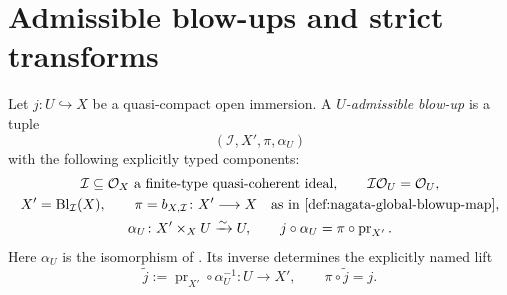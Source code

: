 \section{Admissible blow-ups and strict transforms}

\begin{definition}
  \label{def:nagata-admissible-blowup}
  \lean{}

  Let $j\colon U\hookrightarrow X$ be a quasi-compact open immersion.  A
  \emph{$U$-admissible blow-up} is a tuple
  \[
    (\mathcal I,X',\pi,\alpha_U)
  \]
  with the following explicitly typed components:
  \[
  \begin{gathered}
    \mathcal I\subseteq\mathcal O_X
       \text{ a finite-type quasi-coherent ideal},\qquad
    \mathcal I\mathcal O_U=\mathcal O_U,\\
    X'=\operatorname{Bl}_{\mathcal I}(X),\qquad
    \pi=b_{X,\mathcal I}\colon X'\longrightarrow X
       \quad\text{as in \Cref{def:nagata-global-blowup-map}},\\
    \alpha_U\colon X'\times_XU\xrightarrow{\sim}U,\qquad
    j\circ\alpha_U
      =\pi\circ\operatorname{pr}_{X'}.
  \end{gathered}
  \]
  Here $\alpha_U$ is the isomorphism of
  .  Its inverse determines the
  explicitly named lift
  \[
    \widetilde j
      :=\operatorname{pr}_{X'}\circ\alpha_U^{-1}
      \colon U\longrightarrow X',
    \qquad
    \pi\circ\widetilde j=j.
  \]
\end{definition}

